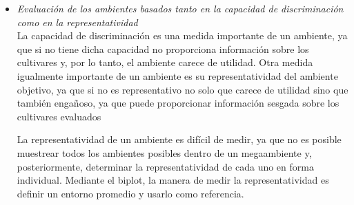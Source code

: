 \begin{itemize}[wide, nosep, labelindent = 0pt, topsep = 1ex, noitemsep,topsep=0pt]



\item \emph{Evaluación de los ambientes basados tanto en la capacidad de discriminación como en la representatividad}\\

La capacidad de discriminación es una medida importante de un ambiente, ya que si no tiene dicha capacidad no proporciona información sobre los cultivares y, por lo tanto, el ambiente carece de utilidad. Otra medida igualmente importante de un ambiente es su representatividad del ambiente objetivo, ya que si no es representativo no solo que carece de utilidad sino que también engañoso, ya que puede proporcionar información sesgada sobre los cultivares evaluados

La representatividad de un ambiente es difícil de medir, ya que no es posible muestrear todos los ambientes posibles dentro de un megaambiente y, posteriormente, determinar la representatividad de cada uno en forma individual. Mediante el biplot, la manera de medir la representatividad es definir un entorno promedio y usarlo como referencia.


\end{itemize}
